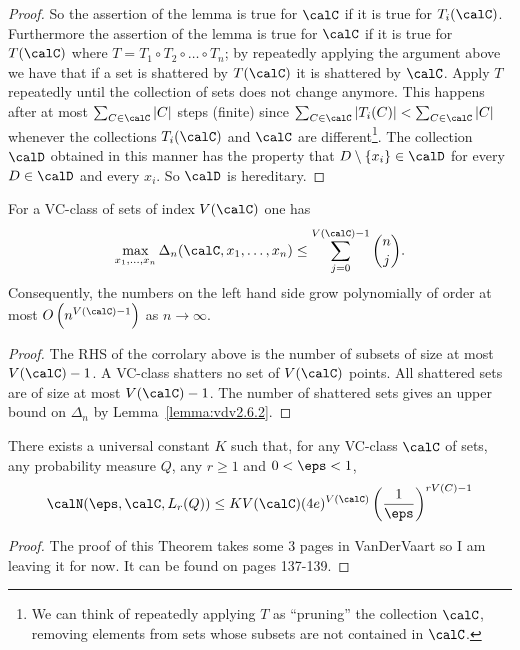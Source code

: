 \begin{proof}
	So the assertion of the lemma is true for \(\calC\) if it is true for \(T_i(\calC)\). Furthermore the assertion of the lemma is true for \(\calC\) if it is true for \(T(\calC)\) where \(T = T_1\circ T_2 \circ \dots\circ T_n\); by repeatedly applying the argument above we have that if a set is shattered by \(T(\calC)\) it is shattered by \(\calC\). Apply \(T\) repeatedly until the collection of sets does not change anymore. This happens after at most \(\sum_{C\in\calC}|C|\) steps (finite) since \(\sum_{C\in\calC} |T_i(C)| < \sum_{C\in\calC} |C|\) whenever the collections \(T_i(\calC)\) and \(\calC\) are different\footnote{We can think of repeatedly applying \(T\) as ``pruning'' the collection \(\calC\), removing elements from sets whose subsets are not contained in \(\calC\).}.  The collection \(\calD\) obtained in this manner has the property that \(D\setminus\{x_i\}\in\calD\) for every
	\(D\in\calD\) and every \(x_i\). So \(\calD\) is hereditary.
\end{proof}

\begin{corollary}
    \label{corr:vdv2.6.3}
	For a VC-class of sets of index \(V(\calC)\) one has
	\[
		\max_{x_1,\dots,x_n} \Delta_n(\calC,x_1,\dots,x_n) \leq \sum_{j=0}^{V(\calC)-1} \binom{n}{j}
	.\]
	Consequently, the numbers on the left hand side grow polynomially of order at most \(O\left(n^{V(\calC)-1}\right)\) as \(n\to\infty\).
\end{corollary}
\begin{proof}
	The RHS of the corrolary above is the number of subsets of size at most \(V(\calC)-1\). A VC-class shatters no set of \(V(\calC)\) points. All shattered sets are of size at most \(V(\calC)-1\). The number of shattered sets gives an upper bound on \(\Delta_n\) by Lemma~\ref{lemma:vdv2.6.2}. 
\end{proof}

\begin{theorem}
	\label{thm:vdv2.6.4}
	There exists a universal constant \(K\) such that, for any VC-class \(\calC\) of sets, any probability measure \(Q\), any \(r \geq 1\) and \(0 < \eps < 1\),
	\begin{equation}
		\label{eq:vdv2.6.4}
		\calN(\eps,\calC,L_r(Q)) \leq KV(\calC)(4e)^{V(\calC)}\left(\frac{1}{\eps} \right)^{rV(C)-1}
	\end{equation} 
\end{theorem}
\begin{proof}
	The proof of this Theorem takes some 3 pages in VanDerVaart so I am leaving it for now. It can be found on pages 137-139. 
\end{proof}

